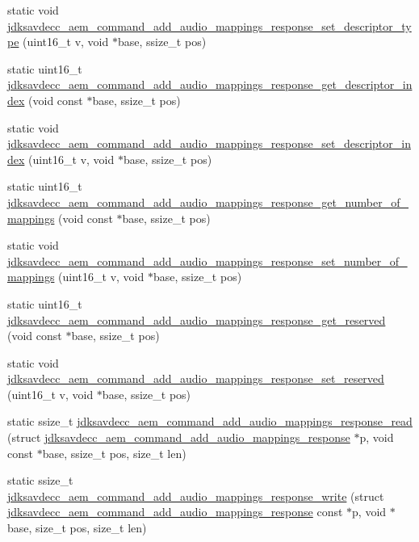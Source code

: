 \begin{DoxyCompactItemize}
\item 
static void \hyperlink{group__command__add__audio__mappings__response_ga31853061d0a9e51ee06487028ec90c6a}{jdksavdecc\+\_\+aem\+\_\+command\+\_\+add\+\_\+audio\+\_\+mappings\+\_\+response\+\_\+set\+\_\+descriptor\+\_\+type} (uint16\+\_\+t v, void $\ast$base, ssize\+\_\+t pos)
\item 
static uint16\+\_\+t \hyperlink{group__command__add__audio__mappings__response_ga76045e388d5d0ff951b2a1e991196c01}{jdksavdecc\+\_\+aem\+\_\+command\+\_\+add\+\_\+audio\+\_\+mappings\+\_\+response\+\_\+get\+\_\+descriptor\+\_\+index} (void const $\ast$base, ssize\+\_\+t pos)
\item 
static void \hyperlink{group__command__add__audio__mappings__response_ga40d57d3fff45a154612e697cbe78565c}{jdksavdecc\+\_\+aem\+\_\+command\+\_\+add\+\_\+audio\+\_\+mappings\+\_\+response\+\_\+set\+\_\+descriptor\+\_\+index} (uint16\+\_\+t v, void $\ast$base, ssize\+\_\+t pos)
\item 
static uint16\+\_\+t \hyperlink{group__command__add__audio__mappings__response_gadbf8fd35c190f525593642d7a3e8bcee}{jdksavdecc\+\_\+aem\+\_\+command\+\_\+add\+\_\+audio\+\_\+mappings\+\_\+response\+\_\+get\+\_\+number\+\_\+of\+\_\+mappings} (void const $\ast$base, ssize\+\_\+t pos)
\item 
static void \hyperlink{group__command__add__audio__mappings__response_ga436ae95629e91254eef5acaee8c71998}{jdksavdecc\+\_\+aem\+\_\+command\+\_\+add\+\_\+audio\+\_\+mappings\+\_\+response\+\_\+set\+\_\+number\+\_\+of\+\_\+mappings} (uint16\+\_\+t v, void $\ast$base, ssize\+\_\+t pos)
\item 
static uint16\+\_\+t \hyperlink{group__command__add__audio__mappings__response_ga91840ca257e843a95f9be247be3c33bd}{jdksavdecc\+\_\+aem\+\_\+command\+\_\+add\+\_\+audio\+\_\+mappings\+\_\+response\+\_\+get\+\_\+reserved} (void const $\ast$base, ssize\+\_\+t pos)
\item 
static void \hyperlink{group__command__add__audio__mappings__response_ga1ab6e9f68c45569c0c995725e5ad31fe}{jdksavdecc\+\_\+aem\+\_\+command\+\_\+add\+\_\+audio\+\_\+mappings\+\_\+response\+\_\+set\+\_\+reserved} (uint16\+\_\+t v, void $\ast$base, ssize\+\_\+t pos)
\item 
static ssize\+\_\+t \hyperlink{group__command__add__audio__mappings__response_ga865d122ac12aa8ff911c20322b5ff13f}{jdksavdecc\+\_\+aem\+\_\+command\+\_\+add\+\_\+audio\+\_\+mappings\+\_\+response\+\_\+read} (struct \hyperlink{structjdksavdecc__aem__command__add__audio__mappings__response}{jdksavdecc\+\_\+aem\+\_\+command\+\_\+add\+\_\+audio\+\_\+mappings\+\_\+response} $\ast$p, void const $\ast$base, ssize\+\_\+t pos, size\+\_\+t len)
\item 
static ssize\+\_\+t \hyperlink{group__command__add__audio__mappings__response_ga58c2a72ad5d205dbee4c0fb6efb5b2e7}{jdksavdecc\+\_\+aem\+\_\+command\+\_\+add\+\_\+audio\+\_\+mappings\+\_\+response\+\_\+write} (struct \hyperlink{structjdksavdecc__aem__command__add__audio__mappings__response}{jdksavdecc\+\_\+aem\+\_\+command\+\_\+add\+\_\+audio\+\_\+mappings\+\_\+response} const $\ast$p, void $\ast$base, size\+\_\+t pos, size\+\_\+t len)
\end{DoxyCompactItemize}


